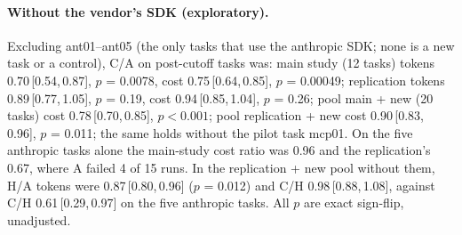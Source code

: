 \documentclass[11pt]{article}
\newcommand{\ci}[2]{\,[#1,\,#2]}
\begin{document}
\paragraph{Without the vendor's SDK (exploratory).}
Excluding ant01--ant05 (the only tasks that use the anthropic SDK; none is a new task or a control), C/A on post-cutoff tasks was: main study (12 tasks) tokens 0.70\ci{0.54}{0.87}, $p$ = 0.0078, cost 0.75\ci{0.64}{0.85}, $p$ = 0.00049; replication tokens 0.89\ci{0.77}{1.05}, $p$ = 0.19, cost 0.94\ci{0.85}{1.04}, $p$ = 0.26; pool main + new (20 tasks) cost 0.78\ci{0.70}{0.85}, $p<0.001$; pool replication + new cost 0.90\ci{0.83}{0.96}, $p$ = 0.011; the same holds without the pilot task mcp01.
On the five anthropic tasks alone the main-study cost ratio was 0.96 and the replication's 0.67, where A failed 4 of 15 runs.
In the replication + new pool without them, H/A tokens were 0.87\ci{0.80}{0.96} ($p$ = 0.012) and C/H 0.98\ci{0.88}{1.08}, against C/H 0.61\ci{0.29}{0.97} on the five anthropic tasks. All $p$ are exact sign-flip, unadjusted.
\end{document}
